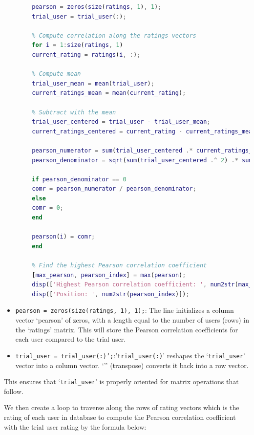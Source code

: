 	\begin{lstlisting}[style=StyleCode, language=MATLAB]
		% Compute the Pearson correlation coefficient
		pearson = zeros(size(ratings, 1), 1);
		trial_user = trial_user(:);
		
		% Compute correlation along the ratings vectors
		for i = 1:size(ratings, 1)
		current_rating = ratings(i, :);
		
		% Compute mean
		trial_user_mean = mean(trial_user);
		current_ratings_mean = mean(current_rating);
		
		% Subtract with the mean
		trial_user_centered = trial_user - trial_user_mean;
		current_ratings_centered = current_rating - current_ratings_mean;
		
		pearson_numerator = sum(trial_user_centered .* current_ratings_centered);
		pearson_denominator = sqrt(sum(trial_user_centered .^ 2) .* sum(current_ratings_centered .^ 2));
		
		if pearson_denominator == 0
		comr = pearson_numerator / pearson_denominator;
		else
		comr = 0;
		end
		
		pearson(i) = comr;
		end
		
		% Find the highest Pearson correlation coefficient
		[max_pearson, pearson_index] = max(pearson);
		disp(['Highest Pearson correlation coefficient: ', num2str(max_pearson)]);
		disp(['Position: ', num2str(pearson_index)]);
	\end{lstlisting}
	
\begin{itemize}[label=-]
	\item \texttt{pearson = zeros(size(ratings, 1), 1);}: The line initializes a column vector ‘pearson’ of zeros, with a length equal to the number of users (rows) in the ‘ratings’ matrix. This will store the Pearson correlation coefficients for each user compared to the trial user.
	\item \texttt{trial\_user = trial\_user(:)';}:'\texttt{trial\_user(:)}' reshapes the ‘\texttt{trial\_user}’ vector into a column vector. ‘'’ (transpose) converts it back into a row vector.
\end{itemize}

This ensures that ‘\texttt{trial\_user}’ is properly oriented for matrix operations that follow.

We then create a loop to traverse along the rows of rating vectors which is the rating of each user in database to compute the Pearson correlation coefficient with the trial user rating by the formula below:

